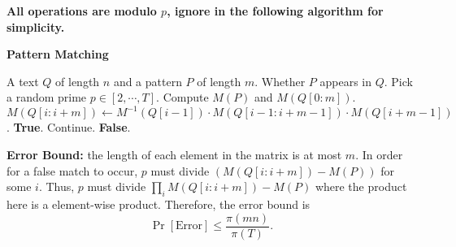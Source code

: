 \begin{answer}
\begin{enumerate}[label=\alph*).]
		\textbf{All operations are modulo $p$, ignore in the following algorithm for simplicity.}
		\begin{algo}
			\caption{\textbf{Pattern Matching}}
			\begin{algorithmic}[1]
				\Require A text $Q$ of length $n$ and a pattern $P$ of length $m$.
				\Ensure Whether $P$ appears in $Q$.
				\State Pick a random prime $p\in [2, \cdots, T]$.
				\State Compute $M(P)$ and $M(Q[0:m])$. 
					\State $M(Q[i:i+m]) \leftarrow M^{-1}(Q[i-1])\cdot M(Q[i-1:i+m-1])\cdot M(Q[i+m-1])$.
						\State \Return \textbf{True}.
					\Else
						\State Continue.
					\EndIf
				\EndFor
				\State \Return \textbf{False}.
			\end{algorithmic}
		\end{algo}
		\textbf{Error Bound:} the length of each element in the matrix is at most $m$. 
		In order for a false match to occur, $p$ must divide $(M(Q[i:i+m]) - M(P))$ for some $i$. 
		Thus, $p$ must divide $\prod_{i} M(Q[i:i+m]) - M(P)$ where the product here is a element-wise product. 
		Therefore, the error bound is
		\[
			\Pr[\text{Error}] \le \frac{\pi(mn)}{\pi(T)}.
		\]
	\end{enumerate}
	\ed
\end{answer}
